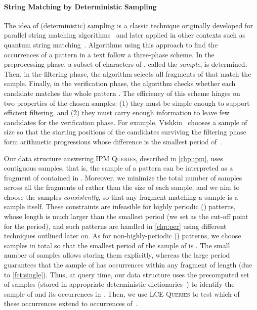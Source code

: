 \documentclass[a4paper]{article}
\theoremstyle{definition}
\theoremstyle{remark}
\newcommand{\IPM}{\textsc{IPM Queries}\xspace}
\newcommand{\LCEQ}{\textsc{LCE Queries}\xspace}
\begin{document}
\paragraph{String Matching by Deterministic Sampling}\label{sec:samp}
The idea of (deterministic) sampling is a classic technique originally developed for parallel string matching algorithms~\cite{DBLP:journals/siamcomp/Vishkin91} and later applied in other contexts such as quantum string matching~\cite{DBLP:journals/jda/HariharanV03}.
Algorithms using this approach to find the occurrences of a pattern  in a text  follow a three-phase scheme.
In the preprocessing phase, a subset of characters of , called the \emph{sample}, is determined.
Then, in the filtering phase, the algorithm selects all fragments  of  that match the sample.
Finally, in the verification phase, the algorithm checks whether each candidate  matches the whole pattern .
The efficiency of this scheme hinges on two properties of the chosen samples: (1) they must be simple enough to support efficient filtering,
and (2) they must carry enough information to leave few candidates for the verification phase.
For example, Vishkin~\cite{DBLP:journals/siamcomp/Vishkin91} chooses a sample of size  so that the starting positions of the candidates surviving the filtering phase form  arithmetic progressions whose difference is the smallest period of~.

Our data structure answering \IPM, described in \cref{chp:ipm}, uses contiguous samples, that is, the sample of a pattern  can be interpreted as a fragment of  contained in . Moreover, we minimize the total number of samples across all the fragments of  rather than the size of each sample,
and we aim to choose the samples \emph{consistently}, so that any fragment matching a sample is a sample itself.
These constraints are infeasible for highly periodic () patterns, whose length is much larger than the smallest period (we set  as the cut-off point for the period), and such patterns are handled in \cref{chp:per} using different techniques outlined later on.
As for non-highly-periodic () patterns, we choose  samples in total so that the smallest period of the sample of  is .
The small number of samples allows storing them explicitly, whereas the large period guarantees that the sample of  has  occurrences within any fragment  of length  (due to \cref{fct:single}).
Thus, at query time, our data structure uses the precomputed set of samples (stored in appropriate deterministic dictionaries~\cite{DBLP:conf/icalp/Ruzic08,DBLP:conf/focs/PatrascuT14}) to identify the sample of  and its occurrences in .
Then, we use \LCEQ to test which of these occurrences extend to occurrences of~.
\end{document}
